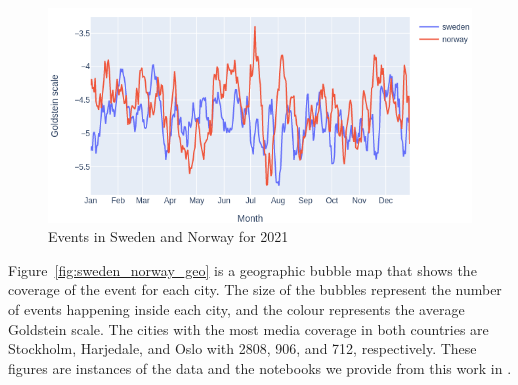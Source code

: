\documentclass[a4, 11pt]{article}
\begin{document}
\begin{figure}[htbp]
    \centering
    \includegraphics[width=\textwidth]{Images/sweden_norway_goldstein.png}%
    \caption{Events in Sweden and Norway for 2021} 
    \label{fig:sweden_norway_goldstein}
\end{figure}

Figure~\ref{fig:sweden_norway_geo} is a geographic bubble map that shows the coverage of the event for each city. The size of the bubbles represent the number of
events happening inside each city, and the colour represents the average Goldstein
scale. The cities with the most media coverage in both countries are Stockholm, Harjedale, and
Oslo with 2808, 906, and 712, respectively. These figures are instances of the data and the notebooks we provide from this work in \cite{lamastex-gdelt-examples}.
\end{document}

